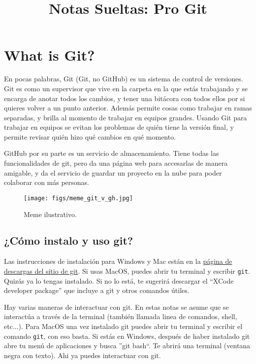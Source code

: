 \documentclass[spanish, 12pt, a4paper]{article}
\title{Notas Sueltas: Pro Git}
\begin{document}
\maketitle
\tableofcontents

\section{What is Git?}
En pocas palabras, Git (Git, no GitHub) es un sistema de control de versiones.
Git es como un supervisor que vive en la carpeta en la que estás trabajando y se
encarga de anotar todos los cambios, y tener una bitácora con todos ellos por si
quieres volver a un punto anterior. Además permite cosas como trabajar en ramas
separadas, y brilla al momento de trabajar en equipos grandes.
Usando Git para trabajar en equipos se evitan los problemas de quién tiene la
versión final, y permite revisar quién hizo qué cambios en qué momento.

GitHub por su parte es un servicio de almacenamiento. Tiene todas las
funcionalidades de git, pero da una página web para accesarlas de manera
amigable, y da el servicio de guardar un proyecto en la nube para poder
colaborar con más personas.

\begin{figure}[h]
  \centering
  \texttt{[image: figs/meme\_git\_v\_gh.jpg]}
  \caption{Meme ilustrativo.}
  \label{fig:lifecycle}
\end{figure}

\subsection{¿Cómo instalo y uso git?}
Las instrucciones de instalación para Windows y Mac están en la
\href{https://git-scm.com/downloads}{página de descargas del sitio de git}.
Si usas MacOS, puedes abrir tu terminal y escribir \texttt{git}. Quizás ya lo
tengas instalado. Si no lo está, te sugerirá descargar el ``XCode developer
package'' que incluye a git y otros comandos útiles.

Hay varias maneras de interactuar con git. En estas notas se asume que se
interactúa a través de la terminal (también llamada linea de comandos, shell,
etc...). Para MacOS una vez instalado git puedes abrir tu terminal y escribir el
comando \texttt{git}, con eso basta. Si estás en Windows, después de haber
instalado git abre tu menú de aplicaciones y busca ''git bash``. Te abrirá una
terminal (ventana negra con texto). Ahi ya puedes interactuar con git.
\end{document}
